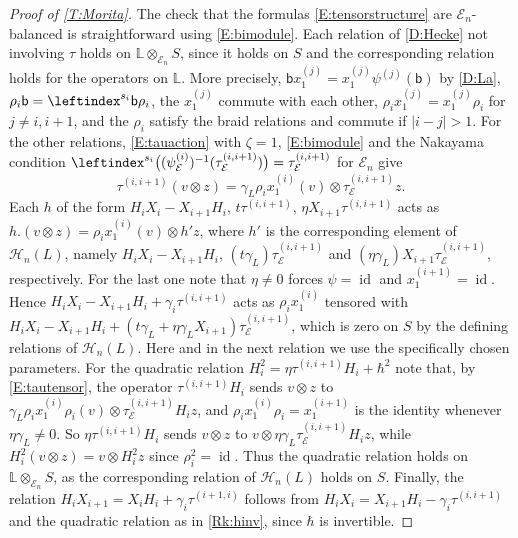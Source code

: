 \documentclass[a4paper,11pt]{amsart}
\numberwithin{equation}{subsection}
\theoremstyle{definition}
\theoremstyle{theorem}
\theoremstyle{remark}
\newcommand\bb{\mathsf{b}}
\newcommand\op{\operatorname}
\newcommand{\Lo}{\mathbb{L}}
\begin{document}
\begin{proof}[Proof of \autoref{T:Morita}]
  The check that the formulas \autoref{E:tensorstructure} are $\mathcal E_n$-balanced is straightforward using \autoref{E:bimodule}. Each relation of \autoref{D:Hecke} not involving $\tau$ holds on $\Lo\otimes_{\mathcal E_n}S$, since it holds on $S$ and the corresponding relation holds for the operators on $\Lo$. More precisely, $\bb x_1^{(j)}=x_1^{(j)}\psi^{(j)}(\bb)$ by \autoref{D:La}, $\rho_i\bb=\leftindex^{s_i}\bb\rho_i$, the $x_1^{(j)}$ commute with each other, $\rho_ix_1^{(j)}=x_1^{(j)}\rho_i$ for $j\ne i,i+1$, and the $\rho_i$ satisfy the braid relations and commute if $|i-j|>1$. For the other relations,
  \autoref{E:tauaction} with $\zeta=1$, \autoref{E:bimodule} and the Nakayama condition $\leftindex^{s_i}{\bigl((\psi^{(i)}_{\mathcal E})^{-1}(\tau^{(i,i+1)}_{\mathcal E})\bigr)}=\tau^{(i,i+1)}_{\mathcal E}$ for $\mathcal E_n$ give
  \begin{equation}\label{E:tautensor}
    \tau^{(i,i+1)}(v\otimes z)
      =\gamma_L \rho_ix_1^{(i)}(v)\otimes\tau^{(i,i+1)}_{\mathcal E}z .
  \end{equation}
  Each $h$ of the form $H_iX_i-X_{i+1}H_i$,
  $t\tau^{(i,i+1)}$, $\eta X_{i+1}\tau^{(i,i+1)}$ acts as
  $h.(v\otimes z)=\rho_ix_1^{(i)}(v)\otimes h'z$, where $h'$ is
  the corresponding element of $\mathcal H_n(L)$, namely
  $H_iX_i-X_{i+1}H_i$, $(t\gamma_L)\tau^{(i,i+1)}_{\mathcal E}$ and $(\eta\gamma_L)X_{i+1}\tau^{(i,i+1)}_{\mathcal E}$, respectively. For the
  last one note that $\eta\ne0$ forces $\psi=\op{id}$ and $x_1^{(i+1)}=\op{id}$. Hence $H_iX_i-X_{i+1}H_i+\gamma_i\tau^{(i,i+1)}$ acts as $\rho_ix_1^{(i)}$ tensored with $H_iX_i-X_{i+1}H_i+(t\gamma_L+\eta\gamma_LX_{i+1})\tau^{(i,i+1)}_{\mathcal E}$, which is zero on $S$ by the defining relations of $\mathcal H_n(L)$.  Here and in the next relation we use the specifically chosen parameters.
  For the quadratic relation $H_i^2=\eta\tau^{(i,i+1)}H_i+\hbar^2$ note that, by
  \autoref{E:tautensor}, the operator $\tau^{(i,i+1)}H_i$ sends $v\otimes z$
  to $\gamma_L\rho_ix_1^{(i)}\rho_i(v)\otimes\tau^{(i,i+1)}_{\mathcal E}H_iz$,
  and $\rho_ix_1^{(i)}\rho_i=x_1^{(i+1)}$ is the identity whenever
  $\eta\gamma_L\ne0$. So $\eta\tau^{(i,i+1)}H_i$ sends $v\otimes z$ to $v\otimes\eta\gamma_L\tau^{(i,i+1)}_{\mathcal E}H_iz$, while
  $H_i^2(v\otimes z)=v\otimes H_i^2z$ since $\rho_i^2=\op{id}$. Thus the quadratic relation holds on
  $\Lo\otimes_{\mathcal E_n}S$, as the corresponding
  relation of $\mathcal H_n(L)$ holds on $S$. Finally, the relation $H_iX_{i+1}=X_iH_i+\gamma_i\tau^{(i+1,i)}$ follows from $H_iX_i=X_{i+1}H_i-\gamma_i\tau^{(i,i+1)}$ and the quadratic relation as in \autoref{Rk:hinv}, since $\hbar$ is invertible.


\end{proof}
\end{document}
